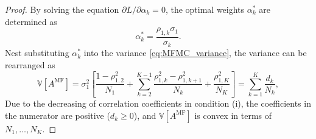 \begin{proof}

By solving the equation $\partial L/\partial \alpha_k=0$, the optimal weights $\alpha_k^*$ are determined as
%
\[
\alpha_k^*=\frac{\rho_{1,k}\sigma_1}{\sigma_k}.
\]
%
Nest substituting $\alpha_k^*$ into the variance \eqref{eq:MFMC_variance}, the variance can be rearranged as
%
\begin{equation}\label{eq:MFMC_var_convex}
    \mathbb{V}\left[A^{\text{MF}}\right]=\sigma_1^2\left[\frac{1-\rho_{1,2}^2}{N_1} + \sum_{k=2}^{K-1} \frac{\rho_{1,k}^2-\rho_{1,k+1}^2}{N_k} + \frac{\rho_{1,K}^2}{N_K} \right] = \sum_{k=1}^K\frac{d_k}{N_k},
\end{equation}
%
Due to the decreasing of correlation coefficients in condition (i), the coefficients in the numerator are positive ($d_k\ge 0$), and $\mathbb{V}\left[A^{\text{MF}}\right]$ is convex in terms of $N_1,\ldots, N_K$. 




\end{proof}

